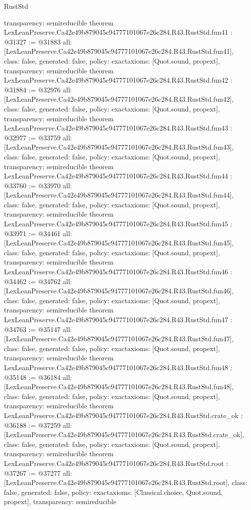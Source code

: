 \begin{lexlean}{RustStd}
\begin{coremodule}
{  transparency: semireducible
}
theorem LexLeanPreserve.Ca42e49b879045c94777101067e26c284.R43.RustStd.fun41 : @31327 := @31883 {
  all: [LexLeanPreserve.Ca42e49b879045c94777101067e26c284.R43.RustStd.fun41],
  class: false,
  generated: false,
  policy: exact{axioms: [Quot.sound, propext]},
  transparency: semireducible
}
theorem LexLeanPreserve.Ca42e49b879045c94777101067e26c284.R43.RustStd.fun42 : @31884 := @32976 {
  all: [LexLeanPreserve.Ca42e49b879045c94777101067e26c284.R43.RustStd.fun42],
  class: false,
  generated: false,
  policy: exact{axioms: [Quot.sound, propext]},
  transparency: semireducible
}
theorem LexLeanPreserve.Ca42e49b879045c94777101067e26c284.R43.RustStd.fun43 : @32977 := @33759 {
  all: [LexLeanPreserve.Ca42e49b879045c94777101067e26c284.R43.RustStd.fun43],
  class: false,
  generated: false,
  policy: exact{axioms: [Quot.sound, propext]},
  transparency: semireducible
}
theorem LexLeanPreserve.Ca42e49b879045c94777101067e26c284.R43.RustStd.fun44 : @33760 := @33970 {
  all: [LexLeanPreserve.Ca42e49b879045c94777101067e26c284.R43.RustStd.fun44],
  class: false,
  generated: false,
  policy: exact{axioms: [Quot.sound, propext]},
  transparency: semireducible
}
theorem LexLeanPreserve.Ca42e49b879045c94777101067e26c284.R43.RustStd.fun45 : @33971 := @34461 {
  all: [LexLeanPreserve.Ca42e49b879045c94777101067e26c284.R43.RustStd.fun45],
  class: false,
  generated: false,
  policy: exact{axioms: [Quot.sound, propext]},
  transparency: semireducible
}
theorem LexLeanPreserve.Ca42e49b879045c94777101067e26c284.R43.RustStd.fun46 : @34462 := @34762 {
  all: [LexLeanPreserve.Ca42e49b879045c94777101067e26c284.R43.RustStd.fun46],
  class: false,
  generated: false,
  policy: exact{axioms: [Quot.sound, propext]},
  transparency: semireducible
}
theorem LexLeanPreserve.Ca42e49b879045c94777101067e26c284.R43.RustStd.fun47 : @34763 := @35147 {
  all: [LexLeanPreserve.Ca42e49b879045c94777101067e26c284.R43.RustStd.fun47],
  class: false,
  generated: false,
  policy: exact{axioms: [Quot.sound, propext]},
  transparency: semireducible
}
theorem LexLeanPreserve.Ca42e49b879045c94777101067e26c284.R43.RustStd.fun48 : @35148 := @36184 {
  all: [LexLeanPreserve.Ca42e49b879045c94777101067e26c284.R43.RustStd.fun48],
  class: false,
  generated: false,
  policy: exact{axioms: [Quot.sound, propext]},
  transparency: semireducible
}
theorem LexLeanPreserve.Ca42e49b879045c94777101067e26c284.R43.RustStd.crate_ok : @36188 := @37259 {
  all: [LexLeanPreserve.Ca42e49b879045c94777101067e26c284.R43.RustStd.crate_ok],
  class: false,
  generated: false,
  policy: exact{axioms: [Quot.sound, propext]},
  transparency: semireducible
}
theorem LexLeanPreserve.Ca42e49b879045c94777101067e26c284.R43.RustStd.root : @37267 := @37277 {
  all: [LexLeanPreserve.Ca42e49b879045c94777101067e26c284.R43.RustStd.root],
  class: false,
  generated: false,
  policy: exact{axioms: [Classical.choice, Quot.sound, propext]},
  transparency: semireducible
}


\end{coremodule}
\end{lexlean}
